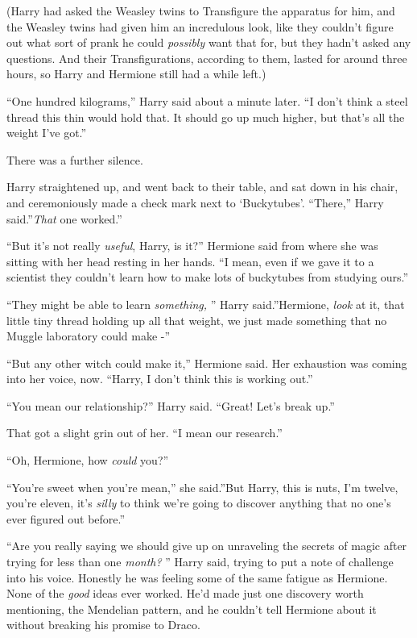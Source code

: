(Harry had asked the Weasley twins to Transfigure the apparatus for him,
and the Weasley twins had given him an incredulous look, like they
couldn't figure out what sort of prank he could \emph{possibly} want
that for, but they hadn't asked any questions. And their
Transfigurations, according to them, lasted for around three hours, so
Harry and Hermione still had a while left.)

``One hundred kilograms,'' Harry said about a minute later. ``I don't
think a steel thread this thin would hold that. It should go up much
higher, but that's all the weight I've got.''

There was a further silence.

Harry straightened up, and went back to their table, and sat down in his
chair, and ceremoniously made a check mark next to `Buckytubes'.
``There,'' Harry said.''\emph{That} one worked.''

``But it's not really \emph{useful}, Harry, is it?'' Hermione said from
where she was sitting with her head resting in her hands. ``I mean, even
if we gave it to a scientist they couldn't learn how to make lots of
buckytubes from studying ours.''

``They might be able to learn \emph{something,} '' Harry said.''Hermione,
\emph{look} at it, that little tiny thread holding up all that weight,
we just made something that no Muggle laboratory could make -''

``But any other witch could make it,'' Hermione said. Her exhaustion was
coming into her voice, now. ``Harry, I don't think this is working
out.''

``You mean our relationship?'' Harry said. ``Great! Let's break up.''

That got a slight grin out of her. ``I mean our research.''

``Oh, Hermione, how \emph{could} you?''

``You're sweet when you're mean,'' she said.''But Harry, this is nuts,
I'm twelve, you're eleven, it's \emph{silly} to think we're going to
discover anything that no one's ever figured out before.''

``Are you really saying we should give up on unraveling the secrets of
magic after trying for less than one \emph{month?} '' Harry said, trying
to put a note of challenge into his voice. Honestly he was feeling some
of the same fatigue as Hermione. None of the \emph{good} ideas ever
worked. He'd made just one discovery worth mentioning, the Mendelian
pattern, and he couldn't tell Hermione about it without breaking his
promise to Draco.

